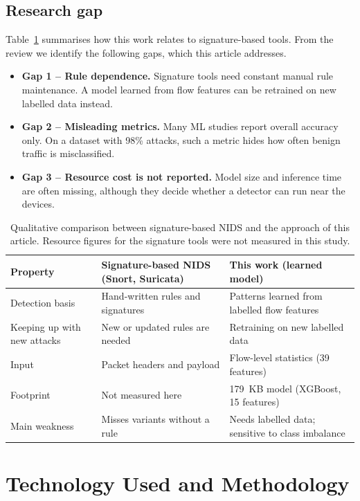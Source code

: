 \documentclass[runningheads]{llncs}
\begin{document}
\subsection{Research gap}
Table~\ref{tab:compare} summarises how this work relates to signature-based tools. From the review we identify the following gaps, which this article addresses.
\begin{itemize}
\item \textbf{Gap 1 -- Rule dependence.} Signature tools need constant manual rule maintenance. A model learned from flow features can be retrained on new labelled data instead.
\item \textbf{Gap 2 -- Misleading metrics.} Many ML studies report overall accuracy only. On a dataset with 98\% attacks, such a metric hides how often benign traffic is misclassified.
\item \textbf{Gap 3 -- Resource cost is not reported.} Model size and inference time are often missing, although they decide whether a detector can run near the devices.
\end{itemize}

\begin{table}[t]
\caption{Qualitative comparison between signature-based NIDS and the approach of this article. Resource figures for the signature tools were not measured in this study.}
\label{tab:compare}
\centering
\small
\begin{tabular}{p{2.4cm}p{4.0cm}p{4.3cm}}
\toprule
Property & Signature-based NIDS (Snort, Suricata) & This work (learned model) \\
\midrule
Detection basis & Hand-written rules and signatures & Patterns learned from labelled flow features \\
Keeping up with new attacks & New or updated rules are needed & Retraining on new labelled data \\
Input & Packet headers and payload & Flow-level statistics (39 features) \\
Footprint & Not measured here & 179~KB model (XGBoost, 15 features) \\
Main weakness & Misses variants without a rule & Needs labelled data; sensitive to class imbalance \\
\bottomrule
\end{tabular}
\end{table}

\section{Technology Used and Methodology}
\label{sec:method}
\end{document}
